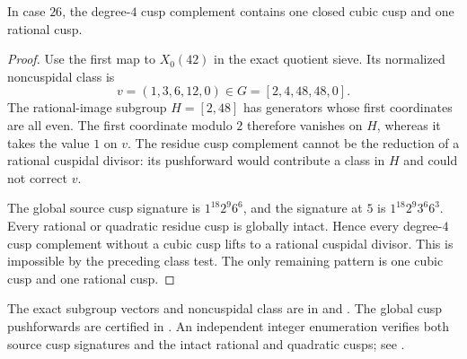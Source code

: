 \begin{lemma}\label{lem:decic242-case26-cubic}
In case $26$, the degree-$4$ cusp complement contains one closed
cubic cusp and one rational cusp.
\end{lemma}
\begin{proof}
Use the first map to $X_0(42)$ in the exact quotient sieve.
Its normalized noncuspidal class is
\[
 v=(1,3,6,12,0)\in
 G=[2,4,48,48,0].
\]
The rational-image subgroup $H=[2,48]$ has generators whose
first coordinates are all even. The first coordinate modulo $2$
therefore vanishes on $H$, whereas it takes the value $1$ on $v$.
The residue cusp complement cannot be the reduction of a rational
cuspidal divisor: its pushforward would contribute a class in $H$
and could not correct $v$.

The global source cusp signature is $1^{18}2^9 6^6$, and the
signature at $5$ is $1^{18}2^9 3^6 6^3$.
Every rational or quadratic residue cusp is globally intact.
Hence every degree-$4$ cusp complement without a cubic cusp lifts
to a rational cuspidal divisor. This is impossible by the preceding
class test. The only remaining pattern is one cubic cusp and one
rational cusp.
\end{proof}

The exact subgroup vectors and noncuspidal class are in
 and
.
The global cusp pushforwards are certified in
.
An independent integer enumeration verifies both source cusp
signatures and the intact rational and quadratic cusps; see
.
